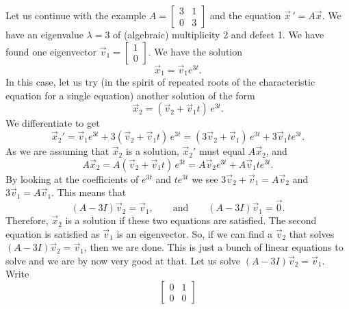 \documentclass[12pt]{book}
\begin{document}
\begin{example}
Let us continue with the example
$A = \left[ \begin{smallmatrix}
3 & 1 \\ 0 & 3
\end{smallmatrix} \right]$ and the equation ${\vec{x}\,}' = A\vec{x}$.
We have an eigenvalue $\lambda=3$ of (algebraic) multiplicity 2 and defect 1.
We have found one eigenvector 
$\vec{v}_1 = \left[ \begin{smallmatrix} 1 \\ 0 \end{smallmatrix} \right]$.
We have the solution
\begin{equation*}
\vec{x}_1 = \vec{v}_1 e^{3t} .
\end{equation*}
In this case, let us try (in the spirit of repeated roots of the
characteristic equation for a single equation) another solution of the form
\begin{equation*}
\vec{x}_2 = ( \vec{v}_2 +  \vec{v}_1 t )\, e^{3t} .
\end{equation*}
We differentiate to get
\begin{equation*}
{\vec{x}_2{}}' =
\vec{v}_1 e^{3t} +
3 ( \vec{v}_2 +  \vec{v}_1 t )\, e^{3t}
=
( 3 \vec{v}_2 + \vec{v}_1 )\, e^{3t} +  3 \vec{v}_1 t e^{3t} .
\end{equation*}
As we are assuming that $\vec{x}_2$ is a solution, ${\vec{x}_2{}}'$ must
equal $A \vec{x}_2$, and
\begin{equation*}
A \vec{x}_2 = 
A ( \vec{v}_2 +  \vec{v}_1 t )\, e^{3t}
=
A \vec{v}_2 e^{3t} +  A \vec{v}_1 t e^{3t} .
\end{equation*}
By looking at the coefficients of $e^{3t}$ and $t e^{3t}$ we see
$3 \vec{v}_2 + \vec{v}_1 = A \vec{v}_2$ and
$3 \vec{v}_1 = A \vec{v}_1$.
This means that
\begin{equation*}
(A-3I)\vec{v}_2 = \vec{v}_1,
\qquad \text{and} \qquad
(A-3I)\vec{v}_1 = \vec{0}.
\end{equation*}
Therefore, $\vec{x}_2$ is a solution
if these two equations are satisfied.
The second equation is satisfied as $\vec{v}_1$ is an
eigenvector.
So, if we can find a $\vec{v}_2$ that solves
$(A-3I)\vec{v}_2 = \vec{v}_1$, then we are done.
This is just a bunch of linear
equations to solve and we are by now very good at that.
%
Let us solve
$(A-3I)\vec{v}_2 = \vec{v}_1$.  Write
\begin{equation*}
\begin{bmatrix}
0 & 1 \\ 0 & 0
\end{bmatrix}

\end{equation*}
\end{example}
\end{document}
